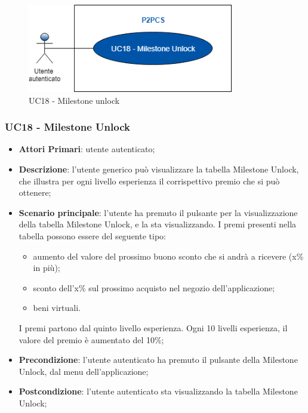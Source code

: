 \begin{figure}[h]
	\includegraphics[width=9cm]{res/images/uc20-21.png}
	\centering
	\caption{UC18 - Milestone unlock}
\end{figure}
\subsubsection{UC18 - Milestone Unlock}
\begin{itemize}
	\item \textbf{Attori Primari}: utente autenticato;
	\item \textbf{Descrizione}: l'utente generico può visualizzare la tabella Milestone Unlock\glo, che illustra per ogni livello esperienza il corrispettivo premio che si può ottenere;	
	\item \textbf{Scenario principale}: l'utente ha premuto il pulsante per la visualizzazione della tabella Milestone Unlock, e la sta visualizzando.
	I premi presenti nella tabella possono essere del seguente tipo:
	\begin{itemize}
		\item aumento del valore del prossimo buono sconto che si andrà a ricevere (x\% in più);
		\item sconto dell'x\% sul prossimo acquisto nel negozio dell'applicazione;
		\item beni virtuali.
	\end{itemize}
	I premi partono dal quinto livello esperienza.
	Ogni 10 livelli esperienza, il valore del premio è aumentato del 10\%;
	\item \textbf{Precondizione}: l'utente autenticato ha premuto il pulsante della Milestone Unlock, dal menu dell'applicazione;
	\item \textbf{Postcondizione}: l'utente autenticato sta visualizzando la tabella Milestone Unlock;
\end{itemize}
